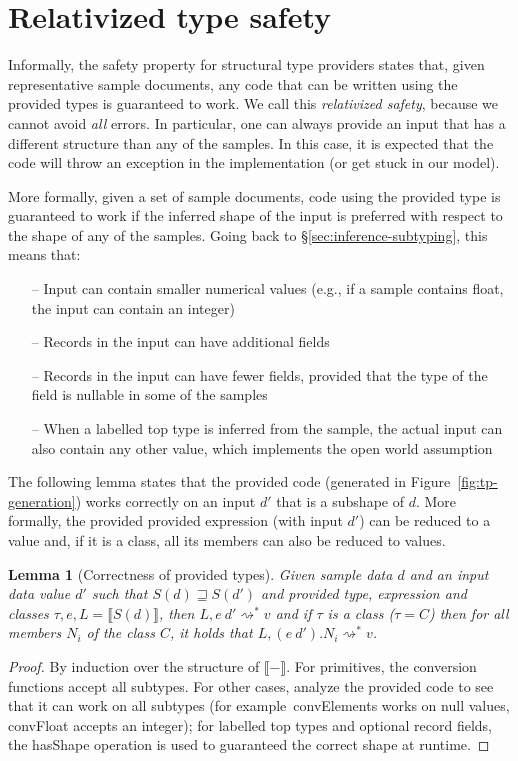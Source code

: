 \documentclass[10pt,preprint,blind,clearpagebib]{sigplanconf}
\newcommand{\kvd}[1]{\textnormal{\textcolor{kvdclr}{\sffamily #1}}}
\newcommand{\ident}[1]{\textnormal{\sffamily #1}}
\newcommand{\reduce}{\rightsquigarrow}
\newcommand{\sem}[1]{\llbracket #1 \rrbracket}
\newcommand{\semalt}[1]{S(#1)}
\newtheorem{lemma}[theorem]{Lemma}
\begin{document}
\section{Relativized type safety}
\label{sec:safety}

Informally, the safety property for structural type providers states that, given representative sample
documents, any code that can be written using the provided types is guaranteed to work. We call this 
\emph{relativized safety}, because we cannot avoid \emph{all} errors. In particular, one can always
provide an input that has a different structure than any of the samples. In this case, it is expected 
that the code will throw an exception in the implementation (or get stuck in our model).

More formally, given a set of sample documents, code using the provided type is guaranteed to work if 
the inferred shape of the input is preferred with respect to the shape of any of the samples. Going back to 
\S\ref{sec:inference-subtyping}, this means that:
%
\begin{itemize}
\item[--] Input can contain smaller numerical values (e.g., if a sample contains float, the input can contain an integer)
\item[--] Records in the input can have additional fields
\item[--] Records in the input can have fewer fields, provided that the type of the field is nullable in some of the samples
\item[--] When a labelled top type is inferred from the sample, the actual input can also contain any other value,
  which implements the open world assumption  
\end{itemize}
%
The following lemma states that the provided code (generated in Figure~\ref{fig:tp-generation})
works correctly on an input $d'$ that is a subshape of $d$. More formally, the provided
provided expression (with input $d'$) can be reduced to a value and, if it is a class,
all its members can also be reduced to values.

\begin{lemma}[Correctness of provided types]
\label{thm:tp-correctness}
Given sample data $d$ and an input data value $d'$ such that $\semalt{d} \sqsupseteq \semalt{d'}$
and provided type, expression and classes $\tau, e, L = \sem{\semalt{d}}$, 
then $L, e~d' \reduce^{*} v$ and if $\tau$ is a class ($\tau=C$) then for all members $N_i$ of the 
class $C$, it holds that $L, (e~d').N_i \reduce^{*} v$.
\end{lemma}
\begin{proof}
By induction over the structure of $\sem{-}$. For primitives, the conversion functions accept all subtypes.
For other cases, analyze the provided code to see that it can work on all subtypes (for example~\ident{convElements}
works on \kvd{null} values, \ident{convFloat} accepts an integer); for labelled top types and
optional record fields, the \ident{hasShape} operation is used to guaranteed the correct shape at runtime.
\end{proof}
\end{document}

